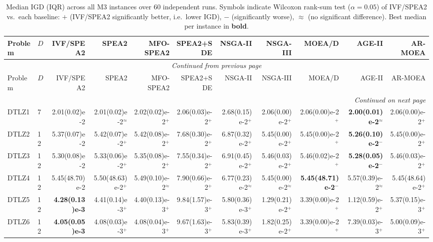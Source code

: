 \begin{longtable}{llrrrrrrrrr}
\caption{Median IGD (IQR) across all M3 instances over 60 independent runs. Symbols indicate Wilcoxon rank-sum test ($\alpha=0.05$) of IVF/SPEA2 vs.\ each baseline: $+$ (IVF/SPEA2 significantly better, i.e.\ lower IGD), $-$ (significantly worse), $\approx$ (no significant difference). Best median per instance in \textbf{bold}.}
\label{tab:igd_per_instance_m3}\\
\toprule
Problem & $D$ & IVF/SPEA2 & SPEA2 & MFO-SPEA2 & SPEA2+SDE & NSGA-II & NSGA-III & MOEA/D & AGE-II & AR-MOEA \\
\midrule
\endfirsthead
\multicolumn{11}{c}{{\textit{Continued from previous page}}} \\
\toprule
Problem & $D$ & IVF/SPEA2 & SPEA2 & MFO-SPEA2 & SPEA2+SDE & NSGA-II & NSGA-III & MOEA/D & AGE-II & AR-MOEA \\
\midrule
\endhead
\midrule
\multicolumn{11}{r}{{\textit{Continued on next page}}} \\
\endfoot
\botrule
\endlastfoot
DTLZ1 & 7 & 2.01(0.02)e-2 & 2.01(0.02)e-2$^{\approx}$ & 2.02(0.02)e-2$^{+}$ & 2.06(0.03)e-2$^{+}$ & 2.68(0.15)e-2$^{+}$ & 2.06(0.00)e-2$^{+}$ & 2.06(0.00)e-2$^{+}$ & \textbf{2.00(0.01)e-2}$^{\approx}$ & 2.06(0.00)e-2$^{+}$ \\
DTLZ2 & 12 & 5.37(0.07)e-2 & 5.42(0.07)e-2$^{+}$ & 5.42(0.08)e-2$^{+}$ & 7.68(0.30)e-2$^{+}$ & 6.87(0.32)e-2$^{+}$ & 5.45(0.00)e-2$^{+}$ & 5.45(0.00)e-2$^{+}$ & \textbf{5.26(0.10)e-2}$^{-}$ & 5.45(0.00)e-2$^{+}$ \\
DTLZ3 & 12 & 5.30(0.08)e-2 & 5.33(0.06)e-2$^{+}$ & 5.35(0.08)e-2$^{+}$ & 7.55(0.34)e-2$^{+}$ & 6.91(0.45)e-2$^{+}$ & 5.46(0.03)e-2$^{+}$ & 5.46(0.02)e-2$^{+}$ & \textbf{5.28(0.05)e-2}$^{-}$ & 5.46(0.03)e-2$^{+}$ \\
DTLZ4 & 12 & 5.45(48.70)e-2 & 5.50(48.63)e-2$^{+}$ & 5.49(0.10)e-2$^{\approx}$ & 7.90(0.66)e-2$^{+}$ & 6.77(0.23)e-2$^{\approx}$ & 5.45(0.00)e-2$^{\approx}$ & \textbf{5.45(48.71)e-2}$^{-}$ & 5.57(0.39)e-2$^{\approx}$ & 5.45(48.64)e-2$^{+}$ \\
DTLZ5 & 12 & \textbf{4.28(0.13)e-3} & 4.41(0.14)e-3$^{+}$ & 4.40(0.13)e-3$^{+}$ & 9.84(1.57)e-3$^{+}$ & 5.80(0.36)e-3$^{+}$ & 1.29(0.21)e-2$^{+}$ & 3.39(0.00)e-2$^{+}$ & 1.12(0.59)e-2$^{+}$ & 5.37(0.15)e-3$^{+}$ \\
DTLZ6 & 12 & \textbf{4.05(0.05)e-3} & 4.08(0.03)e-3$^{+}$ & 4.08(0.04)e-3$^{+}$ & 9.67(1.63)e-3$^{+}$ & 5.83(0.39)e-3$^{+}$ & 1.82(0.25)e-2$^{+}$ & 3.39(0.00)e-2$^{+}$ & 7.39(0.03)e-3$^{+}$ & 5.00(0.09)e-3$^{+}$ \\

\end{longtable}
